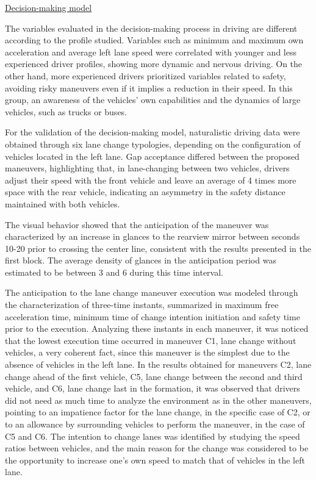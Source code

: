 \underline{Decision-making model }

The variables evaluated in the decision-making process in driving are different according to the profile studied. Variables such as minimum and maximum own acceleration and average left lane speed were correlated with younger and less experienced driver profiles, showing more dynamic and nervous driving. On the other hand, more experienced drivers prioritized variables related to safety, avoiding risky maneuvers even if it implies a reduction in their speed. In this group, an awareness of the vehicles' own capabilities and the dynamics of large vehicles, such as trucks or buses.  

For the validation of the decision-making model, naturalistic driving data were obtained through six lane change typologies, depending on the configuration of vehicles located in the left lane. Gap acceptance differed between the proposed maneuvers, highlighting that, in lane-changing between two vehicles, drivers adjust their speed with the front vehicle and leave an average of 4 times more space with the rear vehicle, indicating an asymmetry in the safety distance maintained with both vehicles. 

The visual behavior showed that the anticipation of the maneuver was characterized by an increase in glances to the rearview mirror between seconds 10-20 prior to crossing the center line, consistent with the results presented in the first block. The average density of glances in the anticipation period was estimated to be between 3 and 6 during this time interval. 

The anticipation to the lane change maneuver execution was modeled through the characterization of three-time instants, summarized in maximum free acceleration time, minimum time of change intention initiation and safety time prior to the execution. Analyzing these instants in each maneuver, it was noticed that the lowest execution time occurred in maneuver C1, lane change without vehicles, a very coherent fact, since this maneuver is the simplest due to the absence of vehicles in the left lane. In the results obtained for maneuvers C2, lane change ahead of the first vehicle, C5, lane change between the second and third vehicle,  and C6, lane change last in the formation, it was observed that drivers did not need as much time to analyze the environment as in the other maneuvers, pointing to an impatience factor for the lane change, in the specific case of C2, or to an allowance by surrounding vehicles to perform the maneuver, in the case of C5 and C6. The intention to change lanes was identified by studying the speed ratios between vehicles, and the main reason for the change was considered to be the opportunity to increase one's own speed to match that of vehicles in the left lane. 

